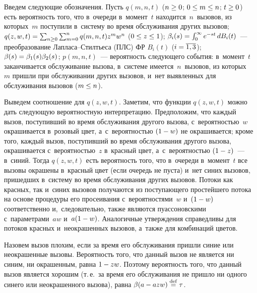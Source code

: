 \begin{multicols}{2}
\smallskip
  
  Введем следующие обозначения. Пусть $q(m,n,t)$ ($n\hm\geq 0$; $0\hm\leq 
m\hm\leq n$; $t\hm\geq0$) есть вероятность того, что в~очереди в~момент~$t$ 
находится~$n$~вызовов, из которых~$m$ поступили в~сис\-те\-му во время 
обслуживания других вызовов; $q(z,w,t)\hm= \sum\nolimits_{n\geq0} 
\sum\nolimits^n_{m=0} q(m,n,t) z^m w^n$ ($0\hm\leq z\hm\leq 1$); 
$\beta_i(s)\hm= \int\nolimits_0^\infty e^{-s t}\,dB_i(t)$~--- преобразование 
Лап\-ла\-са--Стилть\-еса (ПЛС) ФР $B_i(t)$ ($i\hm= \overline{1,3}$); 
$\beta(s)\hm= \beta_1(s)\beta_2(s)$; $p(m,n,t)$~--- вероятность следующего 
события: в~момент~$t$ заканчивается обслуживание вызова, в~системе 
имеется~$n$~вызовов, из которых~$m$ пришли при обслуживании других 
вызовов, и~нет выявленных для обслуживания вызовов ($m\hm\leq n$). 
  
  Выведем соотношение для $q(z,w,t)$. Заметим, что функции $q(z,w,t)$ можно 
дать следующую вероятностную интерпретацию. Предположим, что каждый 
вызов, поступивший во время обслуживания другого вызова, 
с~вероятностью~$w$ окрашивается в~розовый цвет, а~с~вероятностью $(1\hm-
w)$ не окрашивается; кроме того, каждый вызов, поступивший во время 
обслуживания другого вызова, окрашивается с~вероятностью~$z$ в~красный 
цвет, а~с~вероятностью $(1\hm- z)$~--- в~синий. Тогда $q(z,w,t)$ есть 
вероятность того, что в~очереди в~момент~$t$ все вызовы окрашены в~красный 
цвет (если очередь не пуста) и~нет синих вызовов, пришедших в~систему во 
время обслуживания других вызовов. Потоки как красных, так и~синих вызовов 
получаются из поступающего простейшего потока на основе процедуры его 
просеивания с~вероятностями~$w$ и~$(1\hm- w)$ соответственно 
и,~следовательно, также являются пуассоновскими с~параметрами~$a w$ 
и~$a(1\hm-w)$. Аналогичные утверждения справедливы для потоков красных 
и~неокрашенных вызовов, а~также для комбинаций цветов.
  
  Назовем вызов плохим, если за время его обслуживания пришли синие или 
неокрашенные вызовы. Вероятность того, что данный вызов не является ни 
синим, ни окрашенным, равна $1\hm-zw$. Поэтому вероятность того, что 
данный вызов является хорошим (т.\,е.\ за время его обслуживания не пришло 
ни одного синего или неокрашенного вызова), равна $\beta(a\hm- azw) 
\stackrel{\mathrm{def}}{=} \tau$.
  

\end{multicols}
